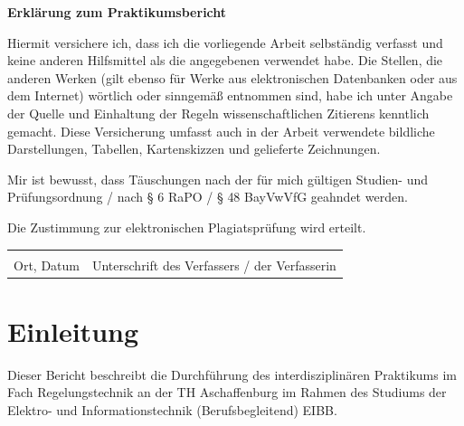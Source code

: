 \documentclass[            %
draft = false,             		%
paper = A4,                		%
pagesize = pdftex,         		%
fontsize = 10pt,           		%
DIV=15,                    		%
twoside = false,           		%
twocolumn = false,         		%
parskip = full,           		%
chapterprefix = false,      		%
appendixprefix = true,     		%
headinclude = false,       		%
footinclude = false,       		%
mpinclude = false,         		%
numbers = auto,            		%
cleardoublepage = plain,   		%
footnotes = multiple,      		%
titlepage = true,          		%
headings = normal,         		%
open = right,              		%
bibliography = openstyle,  		%
listof = chaptergapline,   		%
overfullrule = true,
]{scrbook}
\begin{document}
\newpage



\tableofcontents

\vspace{250px}

\textbf{Erklärung zum Praktikumsbericht}

Hiermit versichere ich, dass ich die vorliegende Arbeit selbständig verfasst
und keine anderen Hilfsmittel als die angegebenen verwendet habe.
Die Stellen, die anderen Werken
(gilt ebenso für Werke aus elektronischen Datenbanken oder aus dem Internet)
wörtlich oder sinngemäß entnommen sind, habe ich unter Angabe der Quelle
und Einhaltung der Regeln wissenschaftlichen Zitierens kenntlich gemacht.
Diese Versicherung umfasst auch in der Arbeit verwendete bildliche Darstellungen,
Tabellen, Kartenskizzen und gelieferte Zeichnungen.

Mir ist bewusst, dass Täuschungen nach der für mich gültigen Studien- und
Prüfungsordnung / nach § 6 RaPO / § 48 BayVwVfG geahndet werden.

Die Zustimmung zur elektronischen Plagiatsprüfung wird erteilt.
\vspace{1.5cm}

\begin{tabular}{@{}p{3.5cm}p{7cm}@{}}
 \hrulefill & \hrulefill \\
 Ort, Datum & Unterschrift des Verfassers / der Verfasserin \\
\end{tabular}

\thispagestyle{empty}




\newpage

\setcounter{page}{1} %


{\let\clearpage\relax \chapter{Einleitung}} \label{chpt:Einleitung_Main}


Dieser Bericht beschreibt die Durchführung des interdisziplinären Praktikums im Fach Regelungstechnik an der TH Aschaffenburg 
im Rahmen des Studiums der Elektro- und Informationstechnik (Berufsbegleitend) EIBB.
\end{document}
